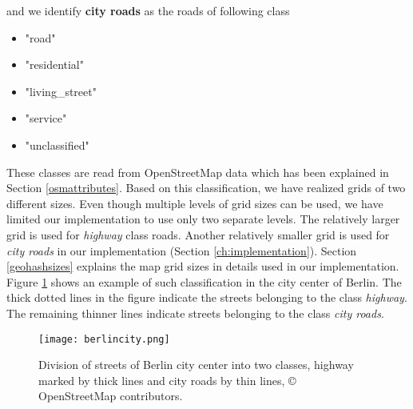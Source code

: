 and we identify \textbf{city roads} as the roads of following class
\begin{itemize}
\item "road"
\item "residential"
\item "living{\_}street"
\item "service"
\item "unclassified"
\end{itemize} 


These classes are read from OpenStreetMap data which has been explained in Section \ref{osmattributes}. Based on this classification, we have realized grids of two different sizes. Even though multiple levels of grid sizes can be used, we have limited our implementation to use only two separate levels. The relatively larger grid is used for \textit{highway} class roads. Another relatively smaller grid is used for \textit{city roads} in our implementation (Section \ref{ch:implementation}). Section \ref{geohashsizes} explains the map grid sizes in details used in our implementation. Figure \ref{fg:diffroads} shows an example of such classification in the city center of Berlin. The thick dotted lines in the figure indicate the streets belonging to the class \textit{highway}. The remaining thinner lines indicate streets belonging to the class \textit{city roads}. 


\begin{figure}
\centering
\texttt{[image: berlincity.png]}
\caption{Division of streets of Berlin city center into two classes, highway marked by thick lines and city roads by thin lines, {\copyright} OpenStreetMap contributors. }
\label{fg:diffroads}
\end{figure}  



